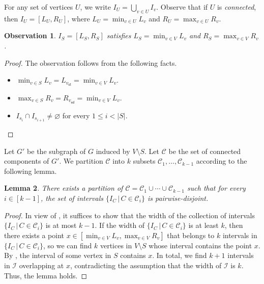 \documentclass[11pt]{article}
\newtheorem{lemma}{Lemma}[section]
\newtheorem{observation}[lemma]{Observation}
\theoremstyle{definition}
\theoremstyle{remark}
\renewcommand{\emptyset}{\varnothing}
\newcommand{\vst}{v_{\mathsf{st}}}
\newcommand{\ved}{v_{\mathsf{ed}}}
\begin{document}
For any set of vertices $U$, we write $I_U= \bigcup_{v \in U} I_v$. Observe that if $U$ is \emph{connected}, then $I_U=[L_U,R_U]$, where $L_U = \min_{v \in U} L_v$ and $R_U = \max_{v \in U} R_v$.  

 \begin{observation}\label{obs2}
$I_S=[L_S,R_S]$ satisfies $L_S = \min_{v \in V} L_v$ and $R_S = \max_{v \in V} R_v$. 
\end{observation}
\begin{proof}
The observation follows from the following facts.
\begin{itemize}
    \item $\min_{v \in S} L_v = L_{\vst} = \min_{v \in V} L_v$. 
    \item $\max_{v \in S} R_v = R_{\ved} = \min_{v \in V} L_v$. 
    \item $I_{s_i} \cap I_{s_{i+1}} \neq \emptyset$ for every $1 \leq i < |S|$. \qedhere
\end{itemize}
\end{proof}

Let $G'$ be the subgraph of $G$ induced by $V \setminus S$. Let $\mathcal{C}$ be the set of connected components of $G'$. We partition $\mathcal{C}$ into $k$
subsets  $\mathcal{C}_1, \ldots, \mathcal{C}_{k-1}$ according to the following lemma.

\begin{lemma}\label{lem:disjoint}
There exists a partition of $\mathcal{C} = \mathcal{C}_1 \cup  \cdots \cup 
 \mathcal{C}_{k-1}$ such that for every $i \in [k-1]$, the set of intervals
$\{ I_C \, | \,  C \in \mathcal{C}_i \}$
is pairwise-disjoint.
\end{lemma}

\begin{proof}
    In view of , it suffices to show that the width of the collection of intervals $\{ I_C \, | \,  C \in \mathcal{C}_i \}$ is at most $k-1$. If the width of  $\{ I_C \, | \,  C \in \mathcal{C}_i \}$  is at least $k$, then there exists a point $x \in [\min_{v \in V} L_v, \max_{v \in V} R_v]$ that belongs to $k$ intervals in $\{ I_C \, | \,  C \in \mathcal{C}_i \}$, so we can find $k$ vertices in $V \setminus S$ whose interval contains the point $x$. By , the interval of some vertex in $S$ contains $x$. In total, we find $k+1$ intervals in $\mathcal{I}$ overlapping at $x$, contradicting the assumption that the width of $\mathcal{I}$ is $k$. Thus, the lemma holds. 
\end{proof}
\end{document}
